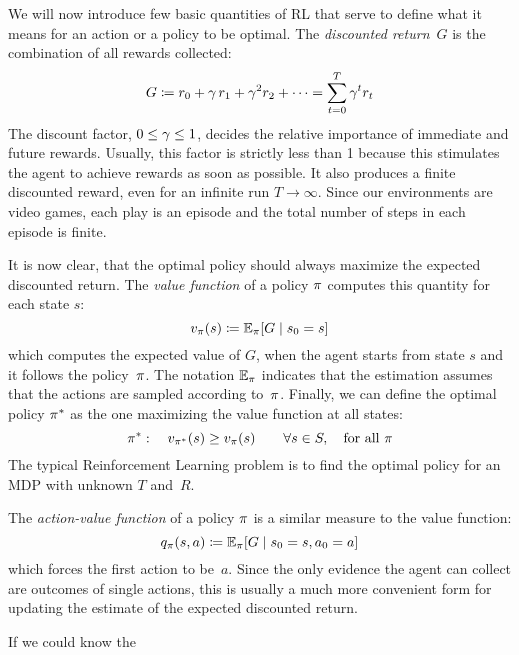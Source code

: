 We will now introduce few basic quantities of RL that serve to define what it
means for an action or a policy to be optimal. The \emph{discounted
return}~$G$ is the combination of all rewards collected:
\begin{equation}
	G \coloneqq r_{0} + \gamma\, r_1 + \gamma^2 r_2 + \dots =
	\sum_{t=0}^{T} \gamma^{t} r_{t}
	\label{eq:return}
\end{equation}
The discount factor, $0 \le \gamma \le 1$, decides the relative importance
of immediate and future rewards. Usually, this factor is strictly less than 1
because this stimulates the agent to achieve rewards as soon as possible.
It also produces a finite discounted reward, even for an infinite run $T \to
\infty$.  Since our environments are video games, each play is an episode and
the total number of steps in each episode is finite.

It is now clear, that the optimal policy should always maximize the expected
discounted return. The \emph{value function} of a policy $\pi$ computes
this quantity for each state $s$:
\begin{equation}
	v_{\pi}(s) \coloneqq \mathbb{E}_{\pi}[G \mid s_0 = s]
\end{equation}
which computes the expected value of $G$, when the agent starts from state $s$
and it follows the policy~$\pi$. The notation $\mathbb{E}_{\pi}$ indicates
that the estimation assumes that the actions are sampled according
to~$\pi$. Finally, we can define the optimal policy $\pi^*$ as the one
maximizing the value function at all states:
\begin{equation}
	\pi^*: \quad v_{\pi^*}(s) \ge v_{\pi}(s) \qquad \forall s \in S,
	\quad \text{for all $\pi$}
\end{equation}
The typical Reinforcement Learning problem is to find the optimal policy for
an MDP with unknown $T$ and~$R$.

The \emph{action-value function} of a policy $\pi$ is a similar measure to
the value function:
\begin{equation}
	q_{\pi}(s, a) \coloneqq \mathbb{E}_{\pi}[G \mid s_0 = s, a_0 = a]
\end{equation}
which forces the first action to be~$a$. Since the only evidence the agent can
collect are outcomes of single actions, this is usually a much more convenient
form for updating the estimate of the expected discounted return.

If we could know the 





